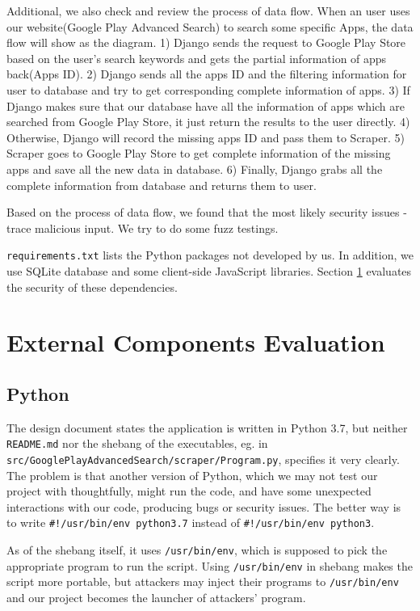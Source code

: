 \documentclass[12pt, a4paper]{article}
\newcommand{\code}[1]{\texttt{#1}}
\begin{document}
Additional, we also check and review the process of data flow. When an user uses our website(Google Play Advanced Search) to search some specific Apps, the data flow will show as the diagram. 1) Django sends the request to Google Play Store based on the user's search keywords and gets the partial information of apps back(Apps ID). 2) Django sends all the apps ID and the filtering information for user to database and try to get corresponding complete information of apps. 3) If Django makes sure that our database have all the information of apps which are searched from Google Play Store, it just return the results to the user directly. 4) Otherwise, Django will record the missing apps ID and pass them to Scraper. 5) Scraper goes to Google Play Store to get complete information of the missing apps and save all the new data in database. 6) Finally, Django grabs all the complete information from database and returns them to user.

Based on the process of data flow, we found that the most likely security issues - trace malicious input. We try to do some fuzz testings. 

\code{requirements.txt} lists the Python packages not developed by us. In addition, we use SQLite database and some client-side JavaScript libraries. Section \ref{dependency-evaluation} evaluates the security of these dependencies.


\section{External Components Evaluation}
\label{dependency-evaluation}
\subsection{Python}
The design document states the application is written in Python 3.7, but neither \code{README.md} nor the shebang of the executables, eg. in \code{src/\linebreak[0]GooglePlayAdvancedSearch/scraper/Program.py}, specifies it very clearly. The problem is that another version of Python, which we may not test our project with thoughtfully, might run the code, and have some unexpected interactions with our code, producing bugs or security issues. The better way is to write \code{\#!/usr/bin/env python3.7} instead of \code{\#!/usr/bin/env python3}.

As of the shebang itself, it uses \code{/usr/bin/env}, which is supposed to pick the appropriate program to run the script. Using \code{/usr/bin/env} in shebang makes the script more portable, but attackers may inject their programs to \code{/usr/bin/env} and our project becomes the launcher of attackers' program.
\end{document}
